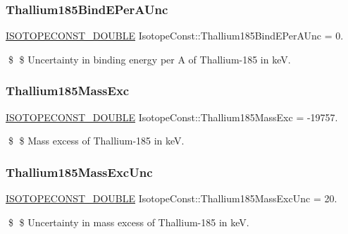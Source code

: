 \subsubsection{\texorpdfstring{Thallium185\+Bind\+E\+Per\+A\+Unc}{Thallium185BindEPerAUnc}}
{\footnotesize\ttfamily \mbox{\hyperlink{group___isotope_const-_macros_ga8f45a7272ce02c0b4c65c44636ed719a}{I\+S\+O\+T\+O\+P\+E\+C\+O\+N\+S\+T\+\_\+\+D\+O\+U\+B\+LE}} Isotope\+Const\+::\+Thallium185\+Bind\+E\+Per\+A\+Unc = 0.}

\$ \$ Uncertainty in binding energy per A of Thallium-\/185 in keV. \mbox{\label{group___isotope_const-_thallium-_tl185_ga2afceab4492bc2c6c90197f76bd95cc9}} 
\subsubsection{\texorpdfstring{Thallium185\+Mass\+Exc}{Thallium185MassExc}}
{\footnotesize\ttfamily \mbox{\hyperlink{group___isotope_const-_macros_ga8f45a7272ce02c0b4c65c44636ed719a}{I\+S\+O\+T\+O\+P\+E\+C\+O\+N\+S\+T\+\_\+\+D\+O\+U\+B\+LE}} Isotope\+Const\+::\+Thallium185\+Mass\+Exc = -\/19757.}

\$ \$ Mass excess of Thallium-\/185 in keV. \mbox{\label{group___isotope_const-_thallium-_tl185_ga60a43e0866fbbe63e34d33f53aff663b}} 
\subsubsection{\texorpdfstring{Thallium185\+Mass\+Exc\+Unc}{Thallium185MassExcUnc}}
{\footnotesize\ttfamily \mbox{\hyperlink{group___isotope_const-_macros_ga8f45a7272ce02c0b4c65c44636ed719a}{I\+S\+O\+T\+O\+P\+E\+C\+O\+N\+S\+T\+\_\+\+D\+O\+U\+B\+LE}} Isotope\+Const\+::\+Thallium185\+Mass\+Exc\+Unc = 20.}

\$ \$ Uncertainty in mass excess of Thallium-\/185 in keV. \mbox{\label{group___isotope_const-_thallium-_tl185_ga018c7830dd4a3e540fa078a5c4d35a7c}} 
